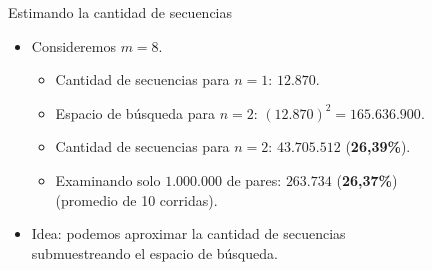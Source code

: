 \documentclass[spanish,xcolor={table}]{beamer}
\begin{document}

\begin{frame}{Estimando la cantidad de secuencias}

\begin{itemize}
  \item Consideremos $m = 8$.
  \begin{itemize}
    \item Cantidad de secuencias para $n=1$: $12.870$.
    \pause
    \item Espacio de búsqueda para $n=2$: $(12.870)^2 = 165.636.900$.
    \pause
    \item Cantidad de secuencias para $n=2$: $43.705.512$ (\textbf{26,39\%}).
    \pause
    \item Examinando solo $1.000.000$ de pares: $263.734$ (\textbf{26,37\%}) \\
      (promedio de 10 corridas).
  \end{itemize}
  \pause
  \item Idea: podemos aproximar la cantidad de secuencias \\ submuestreando el
  espacio de búsqueda.
\end{itemize}  

\end{frame}

\end{document}
